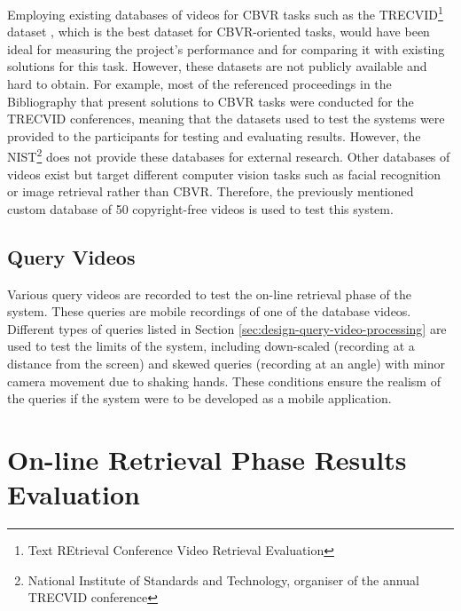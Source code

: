 Employing existing databases of videos for CBVR tasks such as the TRECVID\footnote{Text REtrieval Conference Video Retrieval Evaluation} dataset \cite{2018trecvidawad}, which is the best dataset for CBVR-oriented tasks, would have been ideal for measuring the project's performance and for comparing it with existing solutions for this task. However, these datasets are not publicly available and hard to obtain. For example, most of the referenced proceedings in the Bibliography that present solutions to CBVR tasks were conducted for the TRECVID conferences, meaning that the datasets used to test the systems were provided to the participants for testing and evaluating results. However, the NIST\footnote{National Institute of Standards and Technology, organiser of the annual TRECVID conference} does not provide these databases for external research. Other databases of videos exist but target different computer vision tasks such as facial recognition or image retrieval rather than CBVR. Therefore, the previously mentioned custom database of 50 copyright-free videos is used to test this system.


\subsection{Query Videos}

Various query videos are recorded to test the on-line retrieval phase of the system. These queries are mobile recordings of one of the database videos. Different types of queries listed in Section \ref{sec:design-query-video-processing} are used to test the limits of the system, including down-scaled (recording at a distance from the screen) and skewed queries (recording at an angle) with minor camera movement due to shaking hands. These conditions ensure the realism of the queries if the system were to be developed as a mobile application.\\


\section{On-line Retrieval Phase Results Evaluation}

